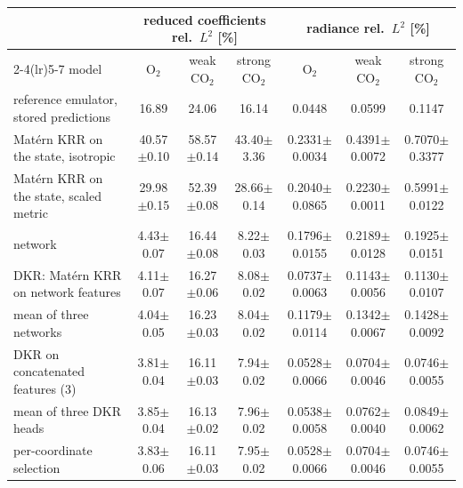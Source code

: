 \begin{tabular}{lcccccc}
\toprule
 & \multicolumn{3}{c}{reduced coefficients rel.\ $L^2$ [\%]} & \multicolumn{3}{c}{radiance rel.\ $L^2$ [\%]} \\
\cmidrule(lr){2-4}\cmidrule(lr){5-7}
model & O$_2$ & weak CO$_2$ & strong CO$_2$ & O$_2$ & weak CO$_2$ & strong CO$_2$ \\
\midrule
reference emulator, stored predictions & 16.89 & 24.06 & 16.14 & 0.0448 & 0.0599 & 0.1147 \\
\midrule
Mat\'ern KRR on the state, isotropic & 40.57$\pm$0.10 & 58.57$\pm$0.14 & 43.40$\pm$3.36 & 0.2331$\pm$0.0034 & 0.4391$\pm$0.0072 & 0.7070$\pm$0.3377 \\
Mat\'ern KRR on the state, scaled metric & 29.98$\pm$0.15 & 52.39$\pm$0.08 & 28.66$\pm$0.14 & 0.2040$\pm$0.0865 & 0.2230$\pm$0.0011 & 0.5991$\pm$0.0122 \\
network & 4.43$\pm$0.07 & 16.44$\pm$0.08 & 8.22$\pm$0.03 & 0.1796$\pm$0.0155 & 0.2189$\pm$0.0128 & 0.1925$\pm$0.0151 \\
DKR: Mat\'ern KRR on network features & 4.11$\pm$0.07 & 16.27$\pm$0.06 & 8.08$\pm$0.02 & 0.0737$\pm$0.0063 & 0.1143$\pm$0.0056 & 0.1130$\pm$0.0107 \\
mean of three networks & 4.04$\pm$0.05 & 16.23$\pm$0.03 & 8.04$\pm$0.02 & 0.1179$\pm$0.0114 & 0.1342$\pm$0.0067 & 0.1428$\pm$0.0092 \\
DKR on concatenated features (3) & 3.81$\pm$0.04 & 16.11$\pm$0.03 & 7.94$\pm$0.02 & 0.0528$\pm$0.0066 & 0.0704$\pm$0.0046 & 0.0746$\pm$0.0055 \\
mean of three DKR heads & 3.85$\pm$0.04 & 16.13$\pm$0.02 & 7.96$\pm$0.02 & 0.0538$\pm$0.0058 & 0.0762$\pm$0.0040 & 0.0849$\pm$0.0062 \\
per-coordinate selection & 3.83$\pm$0.06 & 16.11$\pm$0.03 & 7.95$\pm$0.02 & 0.0528$\pm$0.0066 & 0.0704$\pm$0.0046 & 0.0746$\pm$0.0055 \\
\bottomrule
\end{tabular}
